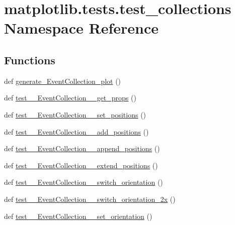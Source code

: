 \hypertarget{namespacematplotlib_1_1tests_1_1test__collections}{}\section{matplotlib.\+tests.\+test\+\_\+collections Namespace Reference}
\label{namespacematplotlib_1_1tests_1_1test__collections}
\subsection*{Functions}
\begin{DoxyCompactItemize}
\item 
def \hyperlink{namespacematplotlib_1_1tests_1_1test__collections_a477b1f18e38addbd29dd93aef03948bf}{generate\+\_\+\+Event\+Collection\+\_\+plot} ()
\item 
def \hyperlink{namespacematplotlib_1_1tests_1_1test__collections_ad2ebb03d889c2812bf950eec7dcbaa00}{test\+\_\+\+\_\+\+Event\+Collection\+\_\+\+\_\+get\+\_\+props} ()
\item 
def \hyperlink{namespacematplotlib_1_1tests_1_1test__collections_a3f2380713e544dc706eb8fe322484aca}{test\+\_\+\+\_\+\+Event\+Collection\+\_\+\+\_\+set\+\_\+positions} ()
\item 
def \hyperlink{namespacematplotlib_1_1tests_1_1test__collections_abdb5ae8c73cbd44628d0d49f93b3b0fc}{test\+\_\+\+\_\+\+Event\+Collection\+\_\+\+\_\+add\+\_\+positions} ()
\item 
def \hyperlink{namespacematplotlib_1_1tests_1_1test__collections_abdef1f6cf3806c5d54203772532b4905}{test\+\_\+\+\_\+\+Event\+Collection\+\_\+\+\_\+append\+\_\+positions} ()
\item 
def \hyperlink{namespacematplotlib_1_1tests_1_1test__collections_a1dfbdf8d111a6e15dd97a2d02b87023b}{test\+\_\+\+\_\+\+Event\+Collection\+\_\+\+\_\+extend\+\_\+positions} ()
\item 
def \hyperlink{namespacematplotlib_1_1tests_1_1test__collections_a7a40c552b4ed6402eabd81638209fce4}{test\+\_\+\+\_\+\+Event\+Collection\+\_\+\+\_\+switch\+\_\+orientation} ()
\item 
def \hyperlink{namespacematplotlib_1_1tests_1_1test__collections_a238fe4cd1d878ab556772d867b6690e9}{test\+\_\+\+\_\+\+Event\+Collection\+\_\+\+\_\+switch\+\_\+orientation\+\_\+2x} ()
\item 
def \hyperlink{namespacematplotlib_1_1tests_1_1test__collections_a13ba0587e3b27ecb90ceb7050aadde8b}{test\+\_\+\+\_\+\+Event\+Collection\+\_\+\+\_\+set\+\_\+orientation} ()

\end{DoxyCompactItemize}
